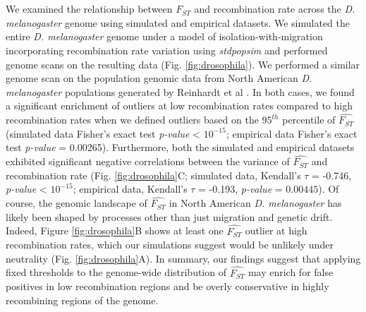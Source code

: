 \documentclass[9pt,twocolumn,twoside]{pnas-new}
\begin{document}
We examined the relationship between $\hat{F_{ST}}$ and recombination rate across the \textit{D. melanogaster} genome using simulated and empirical datasets. We simulated the entire \textit{D. melanogaster} genome under a model of isolation-with-migration incorporating recombination rate variation using \textit{stdpopsim} \cite{adrion2019community} and performed genome scans on the resulting data (Fig. \ref{fig:drosophila}). We performed a similar genome scan on the population genomic data from North American \textit{D. melanogaster} populations generated by Reinhardt et al \cite{Reinhardt2014-xq}. In both cases, we found a significant enrichment of outliers at low recombination rates compared to high recombination rates when we defined outliers based on the $95^{th}$ percentile of $\hat{F_{ST}}$ 
(simulated data Fisher's exact test \textit{p-value} < $10^{-15}$; empirical data Fisher's exact test \textit{p-value} = 0.00265). Furthermore, both the simulated and empirical datasets exhibited significant negative correlations between the variance of $\hat{F_{ST}}$ and recombination rate (Fig. \ref{fig:drosophila}C; simulated data, Kendall's $\tau$ = -0.746, \textit{p-value} < $10^{-15}$; empirical data, Kendall's $\tau$ = -0.193, \textit{p-value} = $0.00445$). Of course, the genomic landscape of $\hat{F_{ST}}$ in North American \textit{D. melanogaster} has likely been shaped by processes other than just migration and genetic drift. Indeed, Figure \ref{fig:drosophila}B shows at least one $\hat{F_{ST}}$ outlier at high recombination rates, which our simulations suggest would be unlikely under neutrality (Fig. \ref{fig:drosophila}A). In summary, our findings suggest that applying fixed thresholds to the genome-wide distribution of $\hat{F_{ST}}$ may enrich for false positives in low recombination regions and be overly conservative in highly recombining regions of the genome. 





\end{document}
